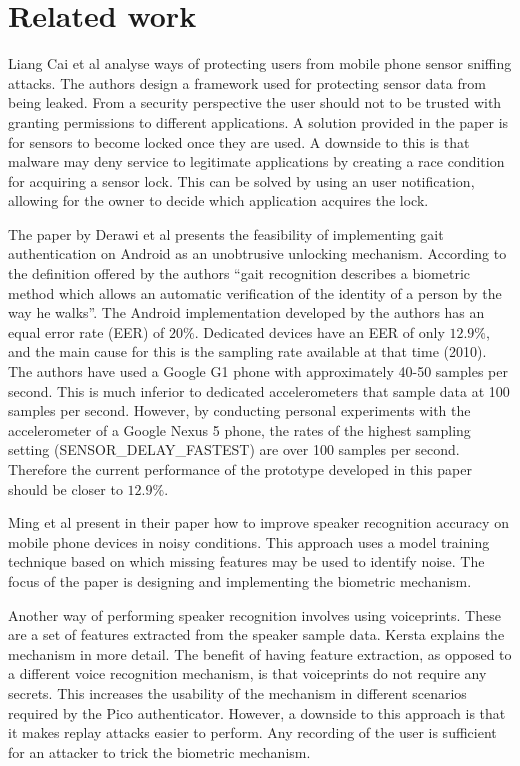 \section{Related work}
Liang Cai et al \cite{cai2009defending} analyse ways of protecting users from mobile phone sensor sniffing attacks. The authors design a framework used for protecting sensor data from being leaked. From a security perspective the user should not to be trusted with granting permissions to different applications. A solution provided in the paper is for sensors to become locked once they are used. A downside to this is that malware may deny service to legitimate applications by creating a race condition for acquiring a sensor lock. This can be solved by using an user notification, allowing for the owner to decide which application acquires the lock.

The paper by Derawi et al \cite{derawi2010unobtrusive} presents the feasibility of implementing gait authentication on Android as an unobtrusive unlocking mechanism. According to the definition offered by the authors ``gait recognition describes a biometric method which allows an automatic verification of the identity of a person by the way he walks''. The Android implementation developed by the authors has an equal error rate (EER) of $20\%$. Dedicated devices have an EER of only $12.9\%$, and the main cause for this is the sampling rate available at that time (2010). The authors have used a Google G1 phone with approximately 40-50 samples per second. This is much inferior to dedicated accelerometers that sample data at 100 samples per second. However, by conducting personal experiments with the accelerometer of a Google Nexus 5 phone, the rates of the highest sampling setting (SENSOR\_DELAY\_FASTEST) are over 100 samples per second. Therefore the current performance of the prototype developed in this paper should be closer to $12.9\%$.

Ming et al \cite{ming2007robust} present in their paper how to improve speaker recognition accuracy on mobile phone devices in noisy conditions. This approach uses a model training technique based on which missing features may be used to identify noise. The focus of the paper is designing and implementing the biometric mechanism.

Another way of performing speaker recognition involves using voiceprints. These are a set of features extracted from the speaker sample data. Kersta \cite{kersta2005voiceprint} explains the mechanism in more detail. The benefit of having feature extraction, as opposed to a different voice recognition mechanism, is that voiceprints do not require any secrets. This increases the usability of the mechanism in different scenarios required by the Pico authenticator. However, a downside to this approach is that it makes replay attacks easier to perform. Any recording of the user is sufficient for an attacker to trick the biometric mechanism.


